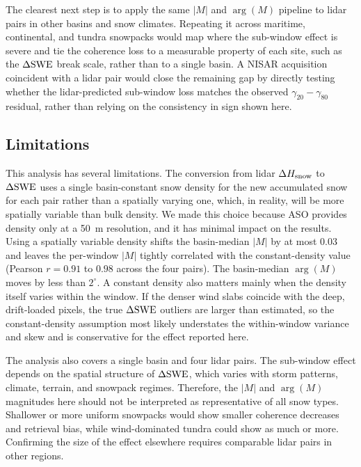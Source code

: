 \documentclass[journal abbreviation, manuscript]{copernicus}
\begin{document}
The clearest next step is to apply the same $|M|$ and $\arg(M)$ pipeline to lidar pairs in other basins and snow climates. Repeating it across maritime, continental, and tundra snowpacks would map where the sub-window effect is severe and tie the coherence loss to a measurable property of each site, such as the $\Delta\mathrm{SWE}$ break scale, rather than to a single basin. A NISAR acquisition coincident with a lidar pair would close the remaining gap by directly testing whether the lidar-predicted sub-window loss matches the observed $\gamma_{20}-\gamma_{80}$ residual, rather than relying on the consistency in sign shown here.

\subsection{Limitations}\label{subsec:limitations}

This analysis has several limitations. The conversion from lidar $\Delta H_{\mathrm{snow}}$ to $\Delta\mathrm{SWE}$ uses a single basin-constant snow density for the new accumulated snow for each pair rather than a spatially varying one, which, in reality, will be more spatially variable than bulk density. We made this choice because ASO provides density only at a 50~m resolution, and it has minimal impact on the results. Using a spatially variable density shifts the basin-median $|M|$ by at most 0.03 and leaves the per-window $|M|$ tightly correlated with the constant-density value (Pearson $r = 0.91$ to $0.98$ across the four pairs). The basin-median $\arg(M)$ moves by less than $2^\circ$. A constant density also matters mainly when the density itself varies within the window. If the denser wind slabs coincide with the deep, drift-loaded pixels, the true $\Delta\mathrm{SWE}$ outliers are larger than estimated, so the constant-density assumption most likely understates the within-window variance and skew and is conservative for the effect reported here.

The analysis also covers a single basin and four lidar pairs. The sub-window effect depends on the spatial structure of $\Delta\mathrm{SWE}$, which varies with storm patterns, climate, terrain, and snowpack regimes. Therefore, the $|M|$ and $\arg(M)$ magnitudes here should not be interpreted as representative of all snow types. Shallower or more uniform snowpacks would show smaller coherence decreases and retrieval bias, while wind-dominated tundra could show as much or more. Confirming the size of the effect elsewhere requires comparable lidar pairs in other regions.
\end{document}
